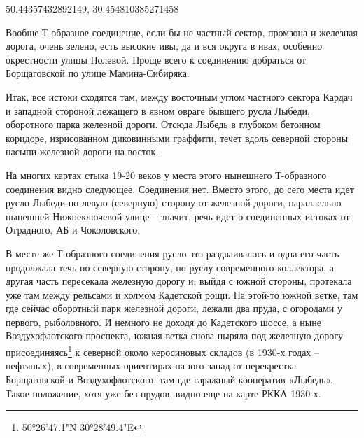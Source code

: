 

50.44357432892149, 30.454810385271458

Вообще Т-образное соединение, если бы не частный сектор, промзона и железная дорога, очень зелено, есть высокие ивы, да и вся округа в ивах, особенно окрестности улицы Полевой. Проще всего к соединению добраться от Борщаговской по улице Мамина-Сибиряка.

Итак, все истоки сходятся там, между восточным углом частного сектора Кардач и западной стороной лежащего в явном овраге бывшего русла Лыбеди, оборотного парка железной дороги. Отсюда Лыбедь в глубоком бетонном коридоре, изрисованном диковинными гра\-ффити, течет вдоль северной стороны насыпи  железной дороги на восток.

На многих картах стыка 19-20 веков у места этого нынешнего Т-образного соединения видно следующее. Соединения нет. Вместо этого, до сего места идет русло Лыбеди по левую (северную) сторону от железной дороги, параллельно нынешней Нижнеключевой улице – значит, речь идет о соединенных истоках от Отрадного, АБ и Чоколовского.

В месте же Т-образного соединения русло это раздваивалось и одна его часть продолжала течь по северную сторону, по руслу современного коллектора, а другая часть пересекала железную дорогу и, выйдя с южной стороны, протекала уже там между рельсами и холмом Кадетской рощи. На этой-то южной ветке, там где сейчас оборотный парк железной дороги, лежали два пруда, с огородами у первого, рыболовного. И немного не доходя до Кадетского шоссе, а ныне Воздухофлотского проспекта, южная ветка снова ныряла под железную дорогу присоединяясь\footnote{50°26'47.1"N 30°28'49.4"E} к северной около керосиновых складов (в 1930-х годах – нефтяных), в современных ориентирах на юго-запад от перекрестка Борщаговской и Воздухофлотского, там где гаражный кооператив «Лыбедь». Такое положение, хотя уже без прудов, видно еще на карте РККА 1930-х.

